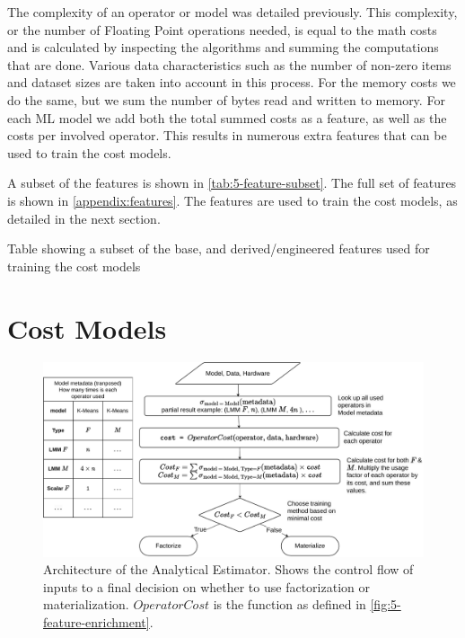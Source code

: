 The complexity of an operator or model was detailed previously. This complexity, or the number of Floating Point operations needed, is equal to the math costs and is calculated by inspecting the algorithms and summing the computations that are done. Various data characteristics such as the number of non-zero items and dataset sizes are taken into account in this process. For the memory costs we do the same, but we sum the number of bytes read and written to memory. For each ML model we add both the total summed costs as a feature, as well as the costs per involved operator. This results in numerous extra features that can be used to train the cost models.

A subset of the features is shown in \autoref{tab:5-feature-subset}. The full set of features is shown in \autoref{appendix:features}. The features are used to train the cost models, as detailed in the next section.

\begin{table}[ht]
    
    \caption[Feature table]{Table showing a subset of the base, and derived/engineered features used for training the cost models}
    \label{tab:5-feature-subset}
\end{table}



\section{Cost Models}
\label{sec:5-cost-models}

\begin{figure}[ht]
    \centering
    \includegraphics[width=\linewidth]{chapters/05_cost_estimation/figures/analytical-architecture.pdf}
    \caption[Analytical Estimator Architecture]{Architecture of the Analytical Estimator. Shows the control flow of inputs to a final decision on whether to use factorization or materialization. $OperatorCost$ is the function as defined in \autoref{fig:5-feature-enrichment}.}
    \label{fig:5-analytical-architecture}
\end{figure}

